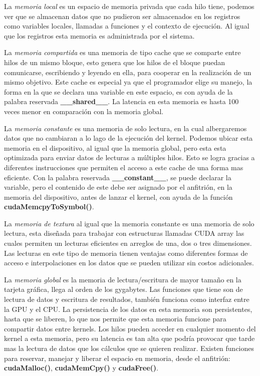 La \textit{memoria local} es un espacio de memoria privada que cada hilo tiene, podemos ver que se almacenan datos que no pudieron ser almacenados en los registros como variables locales, llamadas a funciones y el contexto de ejecución. Al igual que los registros esta memoria es administrada por el sistema.

La \textit{memoria compartida} es una memoria de tipo cache que se comparte entre hilos de un mismo bloque, esto genera que los hilos de el bloque puedan comunicarse, escribiendo y leyendo en ella, para cooperar en la realización de un mismo objetivo. Este cache es especial ya que el programador elige su manejo, la forma en la que se declara una variable en este espacio, es con ayuda de la palabra reservada \textbf{\_\_shared\_\_}. La latencia en esta memoria es hasta 100 veces menor en comparación con la memoria global. 

La\textit{ memoria constante} es una memoria de solo lectura, en la cual albergaremos datos que no cambiaran a lo lago de la ejecución del kernel. Podemos ubicar esta memoria en el dispositivo, al igual que la memoria global, pero esta esta optimizada para enviar datos de lecturas a múltiples hilos. Esto se logra gracias a diferentes instrucciones  que permiten el acceso a este cache de una forma mas eficiente. Con la palabra reservada \textbf{\_\_constant\_\_}, se puede declarar la variable, pero el contenido de este debe ser asignado por el anfitrión, en la memoria del dispositivo, antes de lanzar el kernel, con ayuda de la función \textbf{cudaMemcpyToSymbol()}.

La \textit{memoria de textura} al igual que la memoria constante es una memoria de solo lectura, esta diseñada para trabajar con estructuras llamadas CUDA array las cuales permiten un lecturas eficientes en arreglos de una, dos o tres dimensiones. Las lecturas en este tipo de memoria tienen ventajas como diferentes formas de acceso e interpolaciones en los datos que se pueden utilizar sin costos adicionales.




La \textit{memoria global} es la memoria de lectura/escritura de mayor tamaño en la tarjeta gráfica, llega al orden de los gygabytes. Las funciones que tiene son de lectura de datos y escritura de resultados, también funciona como interfaz entre la GPU y el CPU. La persistencia de los datos en esta memoria son persistentes, hasta que se liberen, lo que nos permite que esta memoria funcione para compartir datos entre kernels. Los hilos pueden acceder en cualquier momento del kernel a esta memoria, pero su latencia es tan alta que podría provocar que tarde mas la lectura de datos que los cálculos que se quieren realizar. Existen funciones para reservar, manejar y liberar el espacio en memoria, desde el anfitrión: \textbf{cudaMalloc()}, \textbf{cudaMemCpy()} y \textbf{cudaFree()}.



